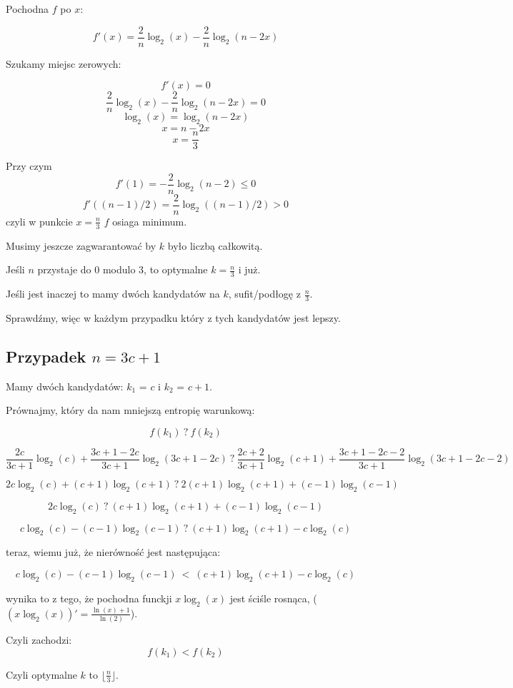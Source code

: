 \documentclass{article}
\begin{document}
Pochodna $f$ po $x$:

$$ f'(x) = \frac{2}{n}\log_2(x) - \frac{2}{n}\log_2(n-2x) $$

Szukamy miejsc zerowych:

$$f'(x) = 0$$
$$\frac{2}{n}\log_2(x) - \frac{2}{n}\log_2(n-2x) = 0$$
$$\log_2(x) = \log_2(n-2x)$$
$$x = n-2x$$
$$x = \frac{n}{3}$$

Przy czym
$$f'(1) = -\frac{2}{n}\log_2(n-2) \le 0$$
$$f'((n-1)/2) = \frac{2}{n}\log_2((n-1)/2) > 0$$
czyli w punkcie $x = \frac{n}{3}$ $f$ osiaga minimum.

Musimy jeszcze zagwarantować by $k$ było liczbą całkowitą.

Jeśli $n$ przystaje do 0 modulo 3, to optymalne $k=\frac{n}{3}$ i już.

Jeśli jest inaczej to mamy dwóch kandydatów na $k$, sufit/podłogę z $\frac{n}{3}$.

Sprawdźmy, więc w każdym przypadku który z tych kandydatów jest lepszy.

\subsection*{Przypadek $n = 3c + 1$}
Mamy dwóch kandydatów:
$k_1$ = $c$ i $k_2$ = $c+1$.

Prównajmy, który da nam mniejszą entropię warunkową:

$$ f(k_1) \:?\: f(k_2) $$

$$  \frac{2c}{3c+1}\log_2(c) + \frac{3c+1-2c}{3c+1}\log_2(3c+1-2c) \: ? \: 
    \frac{2c + 2}{3c+1}\log_2(c+1) + \frac{3c+1-2c-2}{3c+1}\log_2(3c+1-2c-2) $$

$$ 2c\log_2(c) + (c+1)\log_2(c+1) \: ? \: 2(c+1)\log_2(c+1) + (c-1)\log_2(c-1) $$

$$2c\log_2(c) \: ? \:(c+1)\log_2(c+1)+(c-1)\log_2(c-1) $$

$$ c\log_2(c) - (c-1)\log_2(c-1) \: ? \: (c+1)\log_2(c+1) - c\log_2(c)$$

teraz, wiemu już, że nierówność jest następująca:

$$ c\log_2(c) - (c-1)\log_2(c-1) \: < \: (c+1)\log_2(c+1) - c\log_2(c)$$

wynika to z tego, że pochodna funckji $x\log_2(x)$ jest ściśle rosnąca, ($(x\log_2(x))' = \frac{\ln(x)+1}{\ln(2)}$).

Czyli zachodzi:
$$ f(k_1) < f(k_2)$$

Czyli optymalne $k$ to $\lfloor \frac{n}{3} \rfloor$.

\newpage 
\end{document}
